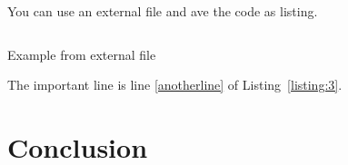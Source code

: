 \documentclass{article}
\begin{document}
You can use an external file and ave the code as listing.
\begin{listing}[ht]
\inputminted[linenos, bgcolor=black, escapeinside=!!]{python}{x.py}
\caption{Example from external file}
\label{listing:3}
\end{listing}
 
The important line is line \ref{anotherline} of Listing~\ref{listing:3}.

\section{Conclusion}




\end{document}
